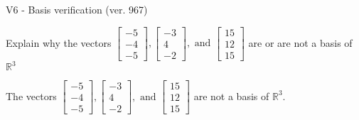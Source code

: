 \begin{exercise}
  \begin{exerciseTitle}V6 - Basis verification (ver. 967)\end{exerciseTitle}
  \begin{exerciseStatement}
    Explain why the vectors \(\left[\begin{array}{r}
-5 \\
-4 \\
-5
\end{array}\right] , \left[\begin{array}{r}
-3 \\
4 \\
-2
\end{array}\right] , \text{ and } \left[\begin{array}{r}
15 \\
12 \\
15
\end{array}\right]\) are or are not a basis of \(\mathbb{R}^3\)	


  \end{exerciseStatement}
  \begin{exerciseAnswer}
   The vectors \(\left[\begin{array}{r}
-5 \\
-4 \\
-5
\end{array}\right] , \left[\begin{array}{r}
-3 \\
4 \\
-2
\end{array}\right] , \text{ and } \left[\begin{array}{r}
15 \\
12 \\
15
\end{array}\right]\) 
  	 are not  a basis of \(\mathbb{R}^3\).
  


  \end{exerciseAnswer}
\end{exercise}